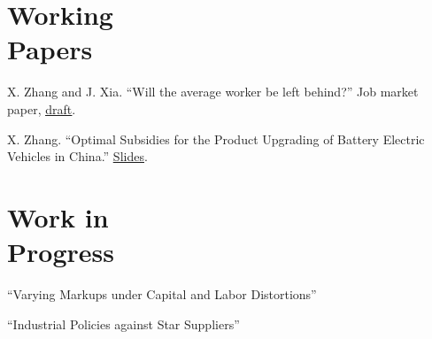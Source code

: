 \documentclass[margin,line]{res}
\newenvironment{list2}{
  \begin{list}{$\bullet$}{%
      \setlength{\itemsep}{0in}
      \setlength{\parsep}{0in} \setlength{\parskip}{0in}
      \setlength{\topsep}{0in} \setlength{\partopsep}{0in} 
      \setlength{\leftmargin}{0.2in}}}{\end{list}}
\begin{document}
\begin{resume}
\section{\sc Working \\ Papers}
X. Zhang and J. Xia. ``Will the average worker be left behind?'' Job market paper, \href{https://xyzhang9.github.io/papers/heterogeneousMarkupTFPGains.pdf}{\underline{draft}}.

X. Zhang. ``Optimal Subsidies for the Product Upgrading of Battery Electric Vehicles in China.'' \href{https://xyzhang9.github.io/presentation/cars.pdf}{\underline{Slides}}.

\section{\sc Work in \\ Progress}
``Varying Markups under Capital and Labor Distortions''

``Industrial Policies against Star Suppliers''

%


\end{resume}
\end{document}
